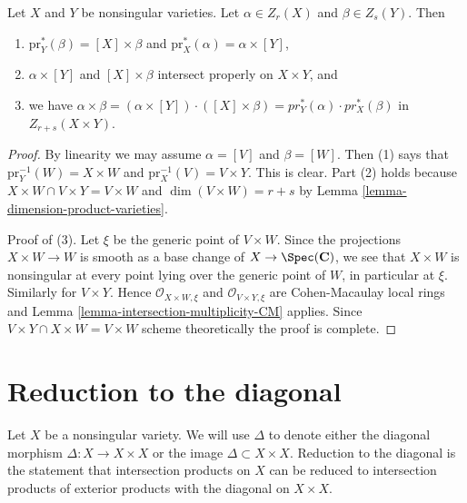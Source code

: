 \begin{lemma}
\label{lemma-exterior-product}
Let $X$ and $Y$ be nonsingular varieties.
Let $\alpha \in Z_r(X)$ and $\beta \in Z_s(Y)$.
Then
\begin{enumerate}
\item $\text{pr}_Y^*(\beta) = [X] \times \beta$ and
$\text{pr}_X^*(\alpha) = \alpha \times [Y]$,
\item $\alpha \times [Y]$ and $[X]\times \beta$
intersect properly on $X\times Y$, and
\item we have
$\alpha \times \beta =
(\alpha \times [Y])\cdot ([X]\times\beta) =
pr_Y^*(\alpha) \cdot pr_X^*(\beta)$
in $Z_{r + s}(X \times Y)$.
\end{enumerate}
\end{lemma}

\begin{proof}
By linearity we may assume $\alpha = [V]$ and $\beta = [W]$.
Then (1) says that $\text{pr}_Y^{-1}(W) = X \times W$ and
$\text{pr}_X^{-1}(V) = V \times Y$. This is clear.
Part (2) holds because $X \times W \cap V \times Y = V \times W$ and
$\dim(V \times W) = r + s$ by Lemma \ref{lemma-dimension-product-varieties}.

\medskip\noindent
Proof of (3).
Let $\xi$ be the generic point of $V \times W$.
Since the projections $X \times W \to W$ is smooth as a base change of
$X \to \Spec(\mathbf{C})$, we see that $X \times W$ is nonsingular
at every point lying over the generic point of $W$, in particular at $\xi$.
Similarly for $V \times Y$. Hence $\mathcal{O}_{X \times W, \xi}$
and $\mathcal{O}_{V \times Y, \xi}$ are Cohen-Macaulay local rings
and Lemma \ref{lemma-intersection-multiplicity-CM} applies.
Since $V \times Y \cap X \times W = V \times W$ scheme theoretically
the proof is complete.
\end{proof}



\section{Reduction to the diagonal}
\label{section-reduction-diagonal}

\noindent
Let $X$ be a nonsingular variety. We will use $\Delta$
to denote either the diagonal morphism $\Delta : X \to X \times X$
or the image $\Delta \subset X \times X$.
Reduction to the diagonal is the statement that
intersection products on $X$ can be reduced to intersection products
of exterior products with the diagonal on $X \times X$.


